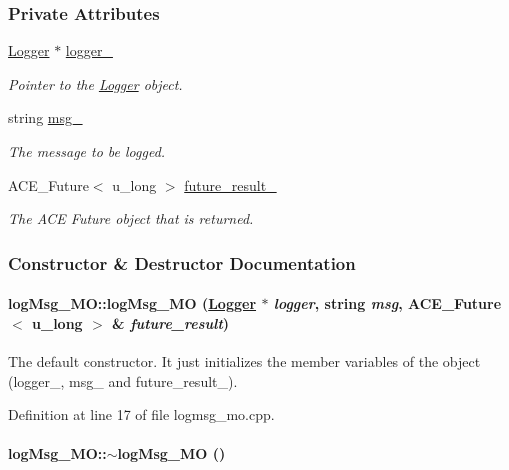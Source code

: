 \subsubsection*{Private Attributes}
\begin{CompactItemize}
\item 
\hyperlink{classLogger}{Logger} $\ast$ \hyperlink{classlogMsg__MO_logMsg__MOo0}{logger\_\-}
\begin{CompactList}\small\item\em Pointer to the \hyperlink{classLogger}{Logger} object.\item\end{CompactList}\item 
string \hyperlink{classlogMsg__MO_logMsg__MOo1}{msg\_\-}
\begin{CompactList}\small\item\em The message to be logged.\item\end{CompactList}\item 
ACE\_\-Future$<$ u\_\-long $>$ \hyperlink{classlogMsg__MO_logMsg__MOo2}{future\_\-result\_\-}
\begin{CompactList}\small\item\em The ACE Future object that is returned.\item\end{CompactList}\end{CompactItemize}


\subsubsection{Constructor \& Destructor Documentation}
\hypertarget{classlogMsg__MO_logMsg__MOa0}{
\paragraph[logMsg\_\-MO]{\setlength{\rightskip}{0pt plus 5cm}log\-Msg\_\-MO::log\-Msg\_\-MO (\hyperlink{classLogger}{Logger} $\ast$ {\em logger}, string {\em msg}, ACE\_\-Future$<$ u\_\-long $>$ \& {\em future\_\-result})}\hfill}
\label{classlogMsg__MO_logMsg__MOa0}


The default constructor. It just initializes the member variables of the object (logger\_\-, msg\_\- and future\_\-result\_\-). 

Definition at line 17 of file logmsg\_\-mo.cpp.\hypertarget{classlogMsg__MO_logMsg__MOa1}{
\paragraph[$\sim$logMsg\_\-MO]{\setlength{\rightskip}{0pt plus 5cm}log\-Msg\_\-MO::$\sim$log\-Msg\_\-MO ()}\hfill}
\label{classlogMsg__MO_logMsg__MOa1}



